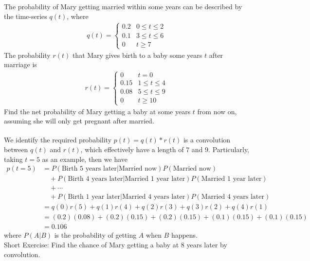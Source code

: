 \begin{exmp}
The probability of Mary getting married within some years can be described by the time-series $q(t)$, where
\begin{align*}
q(t) = 
\begin{cases}
0.2 & 0 \leq t \leq 2 \\
0.1 & 3 \leq t \leq 6 \\
0 & t \geq 7
\end{cases}
\end{align*}
The probability $r(t)$ that Mary gives birth to a baby some years $t$ after marriage is
\begin{align*}
r(t) = 
\begin{cases}
0 & t = 0 \\
0.15 & 1 \leq t \leq 4 \\
0.08 & 5 \leq t \leq 9 \\
0 & t \geq 10
\end{cases}    
\end{align*}
Find the net probability of Mary getting a baby at some years $t$ from now on, assuming she will only get pregnant after married. \\
\\
We identify the required probability $p(t) = q(t) * r(t)$ is a convolution between $q(t)$ and $r(t)$, which effectively have a length of $7$ and $9$. Particularly, taking $t = 5$ as an example, then we have
\begin{align*}
p(t = 5) &= P(\text{Birth 5 years later}|\text{Married now})P(\text{Married now}) \\
&\quad+ P(\text{Birth 4 years later}|\text{Married 1 year later})P(\text{Married 1 year later})\\
&\quad+ \cdots \\
&\quad+ P(\text{Birth 1 year later}|\text{Married 4 years later})P(\text{Married 4 years later}) \\
&= q(0)r(5) + q(1)r(4) + q(2)r(3) + q(3)r(2) + q(4)r(1) \\
&= (0.2)(0.08) + (0.2)(0.15) + (0.2)(0.15) + (0.1)(0.15) + (0.1)(0.15) \\
&= 0.106
\end{align*}
where $P(A|B)$ is the probability of getting $A$ when $B$ happens.\\
Short Exercise: Find the chance of Mary getting a baby at $8$ years later by convolution.
\end{exmp}

